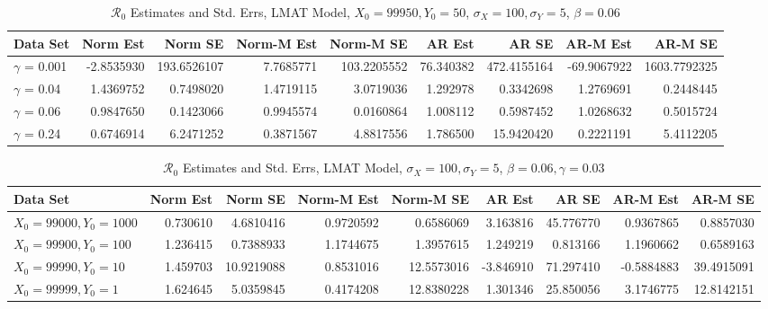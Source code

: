 \documentclass[12pt]{article}
\newcommand{\rr}{\ensuremath{\mathcal{R}_0}}
\begin{document}
\begin{table}[H]
	
	\caption{\label{tab:}$\rr$ Estimates and Std. Errs, LMAT Model,
		$X_0 = 99950, Y_0 = 50$, $\sigma_X = 100, \sigma_Y = 5$, $\beta = 0.06$}
	\centering
	\begin{footnotesize}
		\begin{tabular}[t]{l|r|r|r|r|r|r|r|r}
			\hline
			Data Set & Norm Est & Norm SE & Norm-M Est & Norm-M SE & AR Est & AR SE & AR-M Est & AR-M SE\\
			\hline
			$\gamma$ = 0.001 & -2.8535930 & 193.6526107 & 7.7685771 & 103.2205552 & 76.340382 & 472.4155164 & -69.9067922 & 1603.7792325\\
			\hline
			$\gamma$ = 0.04 & 1.4369752 & 0.7498020 & 1.4719115 & 3.0719036 & 1.292978 & 0.3342698 & 1.2769691 & 0.2448445\\
			\hline
			$\gamma$ = 0.06 & 0.9847650 & 0.1423066 & 0.9945574 & 0.0160864 & 1.008112 & 0.5987452 & 1.0268632 & 0.5015724\\
			\hline
			$\gamma$ = 0.24 & 0.6746914 & 6.2471252 & 0.3871567 & 4.8817556 & 1.786500 & 15.9420420 & 0.2221191 & 5.4112205\\
			\hline
		\end{tabular}
	\end{footnotesize}
\end{table}

\begin{table}[H]
	
	\caption{\label{tab:}$\rr$ Estimates and Std. Errs, LMAT Model,
		$\sigma_X = 100, \sigma_Y = 5$, $\beta = 0.06, \gamma = 0.03$}
	\centering
	\begin{footnotesize}
		\begin{tabular}[t]{l|r|r|r|r|r|r|r|r}
			\hline
			Data Set & Norm Est & Norm SE & Norm-M Est & Norm-M SE & AR Est & AR SE & AR-M Est & AR-M SE\\
			\hline
			$X_0 = 99000, Y_0 = 1000$ & 0.730610 & 4.6810416 & 0.9720592 & 0.6586069 & 3.163816 & 45.776770 & 0.9367865 & 0.8857030\\
			\hline
			$X_0 = 99900, Y_0 = 100$ & 1.236415 & 0.7388933 & 1.1744675 & 1.3957615 & 1.249219 & 0.813166 & 1.1960662 & 0.6589163\\
			\hline
			$X_0 = 99990, Y_0 = 10$ & 1.459703 & 10.9219088 & 0.8531016 & 12.5573016 & -3.846910 & 71.297410 & -0.5884883 & 39.4915091\\
			\hline
			$X_0 = 99999, Y_0 = 1$ & 1.624645 & 5.0359845 & 0.4174208 & 12.8380228 & 1.301346 & 25.850056 & 3.1746775 & 12.8142151\\
			\hline
		\end{tabular}
	\end{footnotesize}
\end{table}
\end{document}
